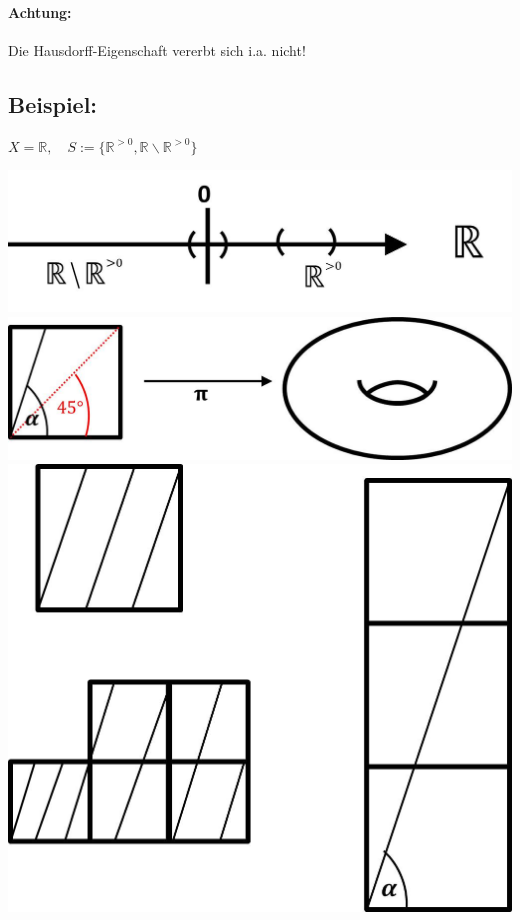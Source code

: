 \documentclass[a4paper,11pt,notitlepage]{report}
\theoremstyle{definition}
\newcommand{\R}{{\ensuremath{\mathbb{R}}}}
\newenvironment{bsp}[1]
{
\setlength{\fboxsep}{10pt}
\subsection*{Beispiel: #1}
\begin{upshape}
}
{
\end{upshape}
}
\begin{document}
\paragraph{Achtung:}
Die Hausdorff-Eigenschaft vererbt sich i.a. nicht!

\begin{bsp}{}
	$X = \R, \quad S:= \{\R^{>0}, \R \backslash \R^{>0}\}$\newline
	\begin{center}
		\includegraphics[scale=0.5]{images/Partition_R.jpg}\newline
		\includegraphics[scale=0.5]{images/Identifizierung_Linien.jpg}\newline
		\includegraphics[scale=0.5]{images/Linien_Quadrat.jpg}\newline
	\end{center}
	

\end{bsp}
\end{document}
